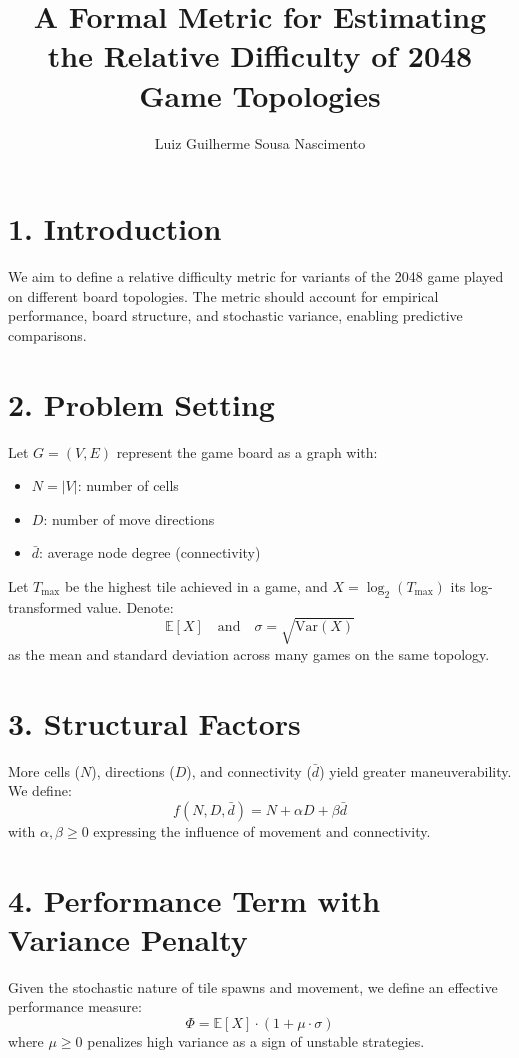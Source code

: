 \documentclass[12pt]{article}
\title{A Formal Metric for Estimating the Relative Difficulty of 2048 Game Topologies}
\author{Luiz Guilherme Sousa Nascimento}
\date{}
\begin{document}
\maketitle

\section*{1. Introduction}
We aim to define a relative difficulty metric for variants of the 2048 game played on different board topologies. The metric should account for empirical performance, board structure, and stochastic variance, enabling predictive comparisons.

\section*{2. Problem Setting}
Let $G = (V, E)$ represent the game board as a graph with:
\begin{itemize}
  \item $N = |V|$: number of cells
  \item $D$: number of move directions
  \item $\bar{d}$: average node degree (connectivity)
\end{itemize}

Let $T_{\text{max}}$ be the highest tile achieved in a game, and $X = \log_2(T_{\text{max}})$ its log-transformed value. Denote:
\[
\mathbb{E}[X] \quad \text{and} \quad \sigma = \sqrt{\mathrm{Var}(X)}
\]
as the mean and standard deviation across many games on the same topology.

\section*{3. Structural Factors}
More cells ($N$), directions ($D$), and connectivity ($\bar{d}$) yield greater maneuverability. We define:
\[
f(N, D, \bar{d}) = N + \alpha D + \beta \bar{d}
\]
with $\alpha, \beta \geq 0$ expressing the influence of movement and connectivity.

\section*{4. Performance Term with Variance Penalty}
Given the stochastic nature of tile spawns and movement, we define an effective performance measure:
\[
\Phi = \mathbb{E}[X] \cdot (1 + \mu \cdot \sigma)
\]
where $\mu \geq 0$ penalizes high variance as a sign of unstable strategies.
\end{document}

